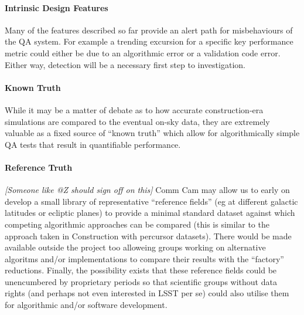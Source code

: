 \paragraph{Intrinsic Design Features}

Many of the features described so far provide an alert path for misbehaviours of the QA system. For example a trending excursion for a specific key performance metric could either be due to an algorithmic error or a validation code error. Either way, detection will be a necessary first step to investigation.

\paragraph{Known Truth}

While it may be a matter of debate as to how accurate construction-era simulations are compared to the eventual on-sky data, they are extremely valuable as a fixed source of ``known truth'' which allow for algorithmically simple QA tests that result in quantifiable performance.

\paragraph{Reference Truth}

\emph{[Someone like @Z should sign off on this]} Comm Cam may allow us to early on develop a small library of representative ``reference fields'' (eg at different galactic latitudes or ecliptic planes) to provide a minimal standard dataset against which competing algorithmic approaches can be compared (this is similar to the approach taken in Construction with percursor datasets). There would be made available outside the project too alloweing groups working on alternative algoritms and/or implementations to compare their results with the ``factory'' reductions. Finally, the possibility exists that these reference fields could be unencumbered by proprietary periods so that scientific groups without data rights (and perhaps not even interested in LSST per se) could also utilise them for algorithmic and/or software development.

